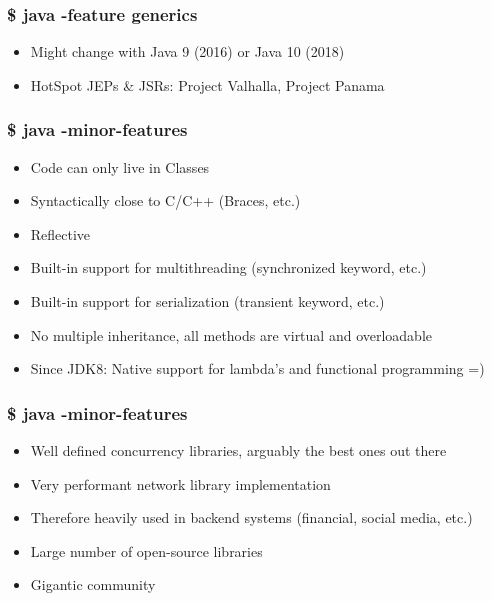 \begin{frame}
  \frametitle{\$ java -feature generics}
 \begin{itemize}
    \item Might change with Java 9 (2016) or Java 10 (2018)
    \vspace{0.4cm}
    \item HotSpot JEPs \& JSRs: Project Valhalla, Project Panama
  \end{itemize}  
\end{frame}


\begin{frame}
  \frametitle{\$ java -minor-features}

 \begin{itemize}
    \item Code can only live in Classes
    \vspace{0.3cm}
    \item Syntactically close to C/C++ (Braces, etc.)
    \vspace{0.3cm}
    \item Reflective
    \vspace{0.3cm}
    \item Built-in support for multithreading (synchronized keyword, etc.)
    \vspace{0.3cm}
    \item Built-in support for serialization (transient keyword, etc.)
    \vspace{0.3cm}
    \item No multiple inheritance, all methods are virtual and overloadable
    \vspace{0.3cm}
    \item Since JDK8: Native support for lambda's and functional programming =)
  \end{itemize}  
  
\end{frame}


\begin{frame}
  \frametitle{\$ java -minor-features}

 \begin{itemize}
    \item Well defined concurrency libraries, arguably the best ones out there
    \vspace{0.3cm}
    \item Very performant network library implementation
    \vspace{0.3cm}  
    \item Therefore heavily used in backend systems (financial, social media, etc.)
    \vspace{0.3cm}
    \item Large number of open-source libraries
    \vspace{0.3cm}
    \item Gigantic community
  \end{itemize}  
  
\end{frame}


